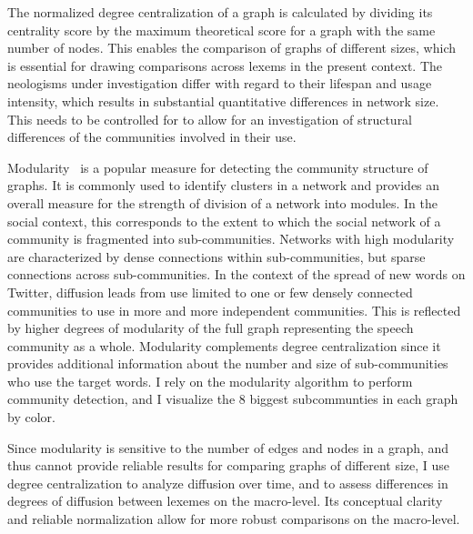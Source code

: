 \documentclass[
  a4paper,
  abstract=on,
  captions=tableabove
  ]{scrartcl}
\begin{document}
  The normalized degree centralization of a graph is calculated by dividing its centrality score by the maximum theoretical score for a graph with the same number of nodes. This enables the comparison of graphs of different sizes, which is essential for drawing comparisons across lexems in the present context. The neologisms under investigation differ with regard to their lifespan and usage intensity, which results in substantial quantitative differences in network size. This needs to be controlled for to allow for an investigation of structural differences of the communities involved in their use.

  Modularity~\parencite{Blondel2008FastUnfolding} is a popular measure for detecting the community structure of graphs. It is commonly used to identify clusters in a network and provides an overall measure for the strength of division of a network into modules. In the social context, this corresponds to the extent to which the social network of a community is fragmented into sub-communities. Networks with high modularity are characterized by dense connections within sub-communities, but sparse connections across sub-communities. In the context of the spread of new words on Twitter, diffusion leads from use limited to one or few densely connected communities to use in more and more independent communities. This is reflected by higher degrees of modularity of the full graph representing the speech community as a whole. Modularity complements degree centralization since it provides additional information about the number and size of sub-communities who use the target words. I rely on the modularity algorithm to perform community detection, and I visualize the 8 biggest subcommunties in each graph by color.

  Since modularity is sensitive to the number of edges and nodes in a graph, and thus cannot provide reliable results for comparing graphs of different size, I use degree centralization to analyze diffusion over time, and to assess differences in degrees of diffusion between lexemes on the macro-level. Its conceptual clarity and reliable normalization allow for more robust comparisons on the macro-level.
\end{document}
